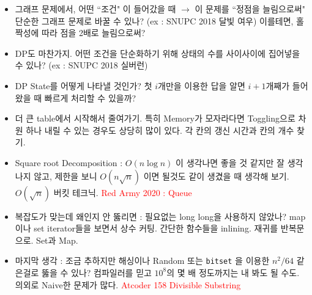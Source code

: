 \documentclass[9pt, a4paper, notitlepage]{extreport}
\begin{document}
\begin{multicols*}{2}
\begin{itemize}
		\item 그래프 문제에서, 어떤 ``조건" 이 들어갔을 때 $\to$ 이 문제를 ``정점을 늘림으로써" 단순한 그래프 문제로 바꿀 수 있나? (ex : SNUPC 2018 달빛 여우) 이를테면, 홀짝성에 따라 점을 2배로 늘림으로써?
		\item DP도 마찬가지. 어떤 조건을 단순화하기 위해 상태의 수를 사이사이에 집어넣을 수 있나? (ex : SNUPC 2018 실버런)
		\item DP State를 어떻게 나타낼 것인가? 첫 $i$개만을 이용한 답을 알면 $i+1$개째가 들어왔을 때 빠르게 처리할 수 있을까?
		\item 더 큰 table에서 시작해서 줄여가기. 특히 Memory가 모자라다면 Toggling으로 차원 하나 내릴 수 있는 경우도 상당히 많이 있다. 각 칸의 갱신 시간과 칸의 개수 찾기.
		\item Square root Decomposition : $O(n \log n)$ 이 생각나면 좋을 것 같지만 잘 생각나지 않고, 제한을 보니 $O(n \sqrt{n})$ 이면 될것도 같이 생겼을 때 생각해 보기. $O(\sqrt{n})$ 버킷 테크닉. \textcolor{red}{Red Army 2020 : Queue}
		\item 복잡도가 맞는데 왜인지 안 뚫리면 : 필요없는 long long을 사용하지 않았나? map이나 set iterator들을 보면서 상수 커팅. 간단한 함수들을 inlining. 재귀를 반복문으로. Set과 Map.
		\item 마지막 생각 : 조금 추하지만 해싱이나 Random 또는 \texttt{bitset} 을 이용한 $n^2 / 64$ 같은걸로 뚫을 수 있나? 컴파일러를 믿고 $10^8$의 몇 배 정도까지는 내 봐도 될 수도. 의외로 Naive한 문제가 많다. \textcolor{red}{Atcoder 158 Divisible Substring}
	\end{itemize}

		\end{multicols*}
\end{document}

